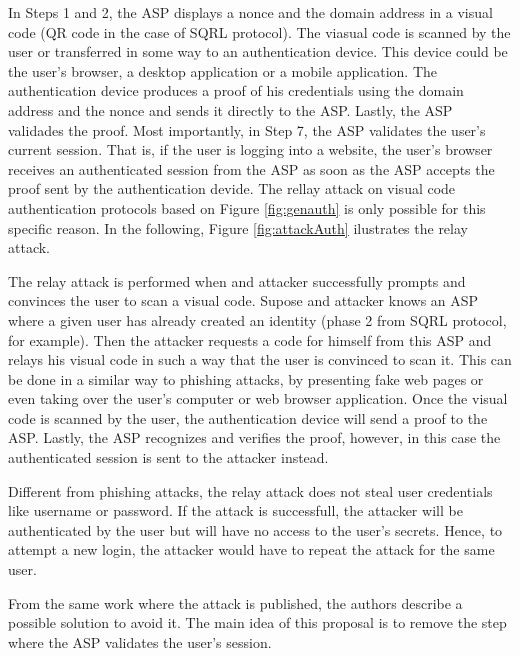 \documentclass{article}
\begin{document}
	
	
	In Steps 1 and 2, the ASP displays a nonce and the domain address in
	a visual code (QR code in the case of SQRL protocol). The viasual code is
	scanned by the user or transferred in some way to an authentication device.
	This device could be the user's browser, a desktop application or a mobile
	application. The authentication device produces a proof of
	his credentials using the domain address and the nonce and sends it directly
	to the ASP. Lastly, the ASP validades the proof. Most importantly, in Step
	7, the ASP validates the user's current session. That is, if the user is
	logging into a website, the user's browser receives an authenticated session
	from the ASP as soon as the ASP accepts the proof sent by the authentication
	devide. The rellay attack on visual code authentication protocols based on Figure
	\ref{fig:genauth} is only possible for this specific reason. In the following,
	Figure \ref{fig:attackAuth} ilustrates the relay attack.

	

	The relay attack is performed when and attacker successfully prompts and
	convinces the user to scan a visual code. Supose and attacker
	knows an ASP where a given user has already created an identity (phase 2
	from SQRL protocol, for example). Then the attacker requests a code for himself 
	from this ASP and relays his visual code in such a way that the user is 
	convinced to scan it.
	This can be done in a similar way to phishing attacks, by presenting fake web
	pages or even taking over the user's computer or web browser application. Once the visual code is
	scanned by the user, the authentication device will send a proof to the ASP.
	Lastly, the ASP recognizes and verifies the proof, however, in this case
	the authenticated session is sent to the attacker instead. 

	Different from
	phishing attacks, the relay attack does not steal user credentials like
	username or password. If the attack is successfull, the attacker will be
	authenticated by the user but will have no access to the user's secrets. 
	Hence, to attempt a new login, the attacker would have to repeat the attack
	for the same user.

	From the same work where the attack is published, the authors describe
	a possible solution to avoid it. The main idea of this proposal is to
	remove the step where the ASP validates the user's session.

	
	
\end{document}
